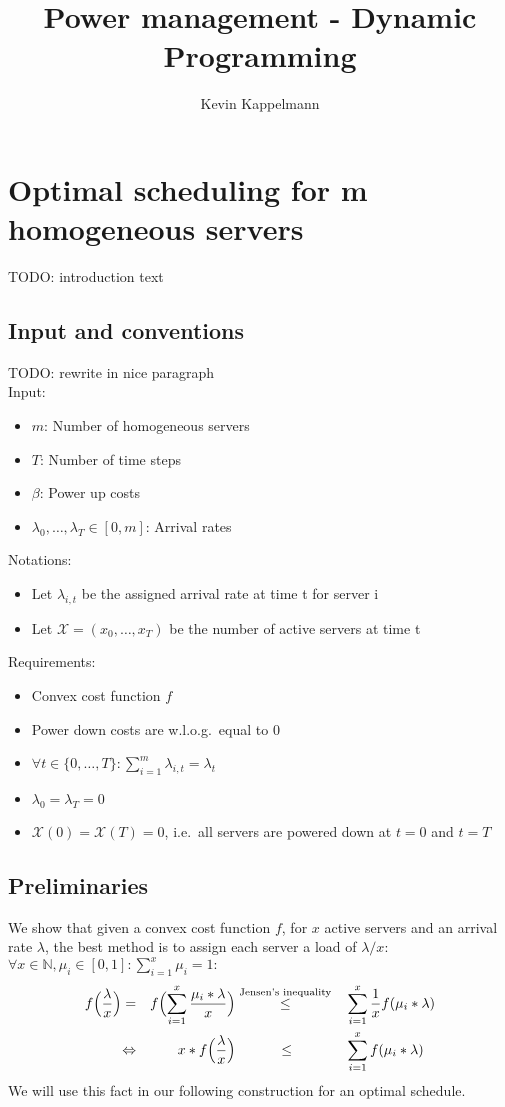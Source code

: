 \documentclass[hidelinks]{article}
\title{Power management - Dynamic Programming}
\author{Kevin Kappelmann\\
  \multicolumn{1}{p{.7\textwidth}}{\centering\emph{Chair for Theoretical Computer Science,\\
  Technical University of Munich}}}
\theoremstyle{plain}
\theoremstyle{definition}
\theoremstyle{rem}
\begin{document}

\begin{sloppypar}
\section{Optimal scheduling for m homogeneous servers}
TODO: introduction text
\subsection{Input and conventions}
TODO: rewrite in nice paragraph\\
Input:
\begin{itemize}
	\item $m$: Number of homogeneous servers
	\item $T$: Number of time steps
	\item $\beta$: Power up costs
	\item $\lambda_0,\ldots,\lambda_{T}\in[0,m]$: Arrival rates
\end{itemize}
Notations:
\begin{itemize}
	\item Let $\lambda_{i,t}$ be the assigned arrival rate at time t for server i
	\item Let $\mathcal{X}=(x_0,\ldots,x_T)$ be the number of active servers at time t
\end{itemize}
Requirements:
\begin{itemize}
	\item Convex cost function $f$
	\item Power down costs are w.l.o.g.\ equal to 0
	\item $\forall t\in \{0,\ldots,T\}:\sum\limits_{i=1}^{m}{\lambda_{i,t}=\lambda_t}$
	\item $\lambda_0=\lambda_T=0$
	\item $\mathcal{X}(0)=\mathcal{X}(T)=0$, i.e.\ all servers are powered down at $t=0$ and $t=T$
\end{itemize}

\subsection{Preliminaries}
We show that given a convex cost function $f$, for $x$ active servers and an arrival rate $\lambda$, the best method is to assign each server a load of $\lambda/x$:\\
$\forall x\in\mathbb{N},\mu_i\in[0,1]:\sum\limits_{i=1}^{x}{\mu_i}=1:$
\begin{alignat}{5}
	f\Bigl(\frac{\lambda}{x}\Bigr)=&&f\Bigl(\sum\limits_{i=1}^x{\frac{\mu_i*\lambda}{x}}\Bigr)&\stackrel{\text{Jensen's inequality}}{\le}&&\sum\limits_{i=1}^x\frac{1}{x}f(\mu_i*\lambda) \nonumber\\
	\Leftrightarrow&&x*f\Bigl(\frac{\lambda}{x}\Bigr)&\qquad\quad\le&&\sum\limits_{i=1}^xf(\mu_i*\lambda) \label{eq:balance}
\end{alignat}
We will use this fact in our following construction for an optimal schedule.


\end{sloppypar}
\end{document}
